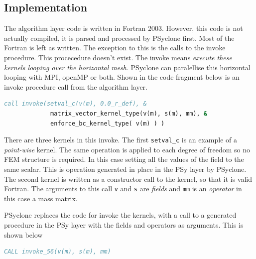 \documentclass[times]{elsarticle}
\begin{document}
\subsection{Implementation}
The algorithm layer code is written in Fortran 2003. However, this
code is not actually compiled, it is parsed and processed by PSyclone
first. Most of the Fortran is left as written. The exception to this
is the calls to the invoke procedure. This procecedure doesn't
exist. The invoke means {\em execute these kernels looping over the horizontal
mesh}. PSyclone can paralellise this horizontal looping with MPI,
openMP or both. Shown in the code fragment below is an invoke
procedure call from the algorithm layer.

\begin{lstlisting}[language=Fortran]
 call invoke(setval_c(v(m), 0.0_r_def), &
             matrix_vector_kernel_type(v(m), s(m), mm), &
             enforce_bc_kernel_type( v(m) ) )
\end{lstlisting}

There are three kernels in this invoke. The first \verb+setval_c+ is
an example of a {\em point-wise} kernel. The same operation is applied
to each degree of freedom so no FEM structure is required. In this
case setting all the values of the field to the same scalar. This is
operation generated in place in the PSy layer by PSyclone. The second
kernel is written as a constructor call to the kernel, so that it is
valid Fortran. The arguments to this call \verb+v+ and \verb+s+ are
{\em fields} and \verb+mm+ is an {\em operator} in this case a mass
matrix.

PSyclone replaces the code for invoke the kernels, with a call to a
generated procedure in the PSy layer with the fields and operators as
arguments. This is shown below
\begin{lstlisting}[language=Fortran]
 CALL invoke_56(v(m), s(m), mm)
\end{lstlisting}
\end{document}
